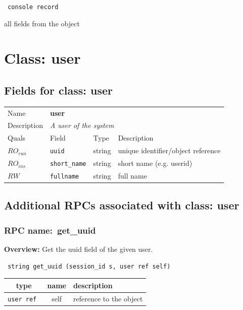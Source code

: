 \vspace{0.3cm}

{\tt 
console record
}


all fields from the object
\vspace{0.3cm}
\vspace{0.3cm}
\vspace{0.3cm}

\vspace{1cm}
\newpage
\section{Class: user}
\subsection{Fields for class: user}
\begin{longtable}{|lllp{}|}
\hline
\multicolumn{1}{|l}{Name} & \multicolumn{3}{l|}{\bf user} \\
\multicolumn{1}{|l}{Description} & \multicolumn{3}{l|}{\parbox{11cm}{\em A user of the system}} \\
\hline
Quals & Field & Type & Description \\
\hline
$\mathit{RO}_\mathit{run}$ &  {\tt uuid} & string & unique identifier/object reference \\
$\mathit{RO}_\mathit{ins}$ &  {\tt short\_name} & string & short name (e.g. userid) \\
$\mathit{RW}$ &  {\tt fullname} & string & full name \\
\hline
\end{longtable}
\subsection{Additional RPCs associated with class: user}
\subsubsection{RPC name:~get\_uuid}

{\bf Overview:} 
Get the uuid field of the given user.

\begin{verbatim} string get_uuid (session_id s, user ref self)\end{verbatim}



 
\vspace{0.3cm}
\begin{tabular}{|c|c|p{7cm}|}
 \hline
{\bf type} & {\bf name} & {\bf description} \\ \hline
{\tt user ref } & self & reference to the object \\ \hline 

\end{tabular}


